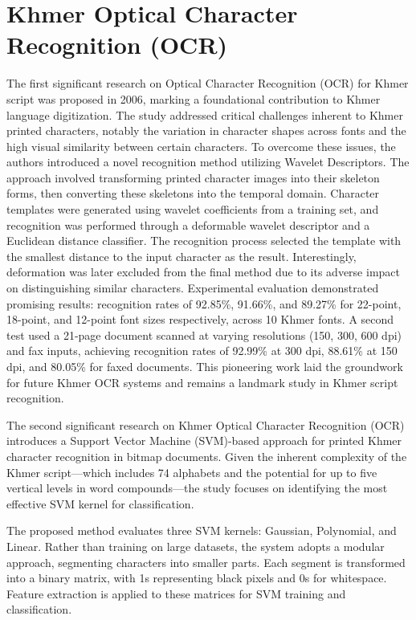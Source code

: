 \section{Khmer Optical Character Recognition (OCR)}
\label{sec:khmer_OCR_literature}

\citet{CheyFirstOCR} The first significant research on Optical Character Recognition (OCR) 
for Khmer script was proposed in 2006, marking a foundational contribution 
to Khmer language digitization. The study addressed critical challenges 
inherent to Khmer printed characters, notably the variation in character 
shapes across fonts and the high visual similarity between certain 
characters. To overcome these issues, the authors introduced a novel 
recognition method utilizing Wavelet Descriptors. The approach involved 
transforming printed character images into their skeleton forms, 
then converting these skeletons into the temporal domain. Character 
templates were generated using wavelet coefficients from a training set, 
and recognition was performed through a deformable wavelet descriptor 
and a Euclidean distance classifier. The recognition process selected 
the template with the smallest distance to the input character as the 
result. Interestingly, deformation was later excluded from the final 
method due to its adverse impact on distinguishing similar characters. 
Experimental evaluation demonstrated promising results: recognition 
rates of 92.85\%, 91.66\%, and 89.27\% for 22-point, 18-point, and 
12-point font sizes respectively, across 10 Khmer fonts. A second 
test used a 21-page document scanned at varying resolutions 
(150, 300, 600 dpi) and fax inputs, achieving recognition rates 
of 92.99\% at 300 dpi, 88.61\% at 150 dpi, and 80.05\% for faxed documents. 
This pioneering work laid the groundwork for future Khmer OCR systems 
and remains a landmark study in Khmer script recognition.

\citet{Sok&Taing2014} The second significant research on 
Khmer Optical Character Recognition (OCR) introduces a Support 
Vector Machine (SVM)-based approach for printed Khmer character 
recognition in bitmap documents. Given the inherent complexity 
of the Khmer script—which includes 74 alphabets and the potential 
for up to five vertical levels in word compounds—the study focuses 
on identifying the most effective SVM kernel for classification.

The proposed method evaluates three SVM kernels: Gaussian, Polynomial, 
and Linear. Rather than training on large datasets, the system adopts 
a modular approach, segmenting characters into smaller parts. Each 
segment is transformed into a binary matrix, with 1s representing 
black pixels and 0s for whitespace. Feature extraction is applied 
to these matrices for SVM training and classification.

